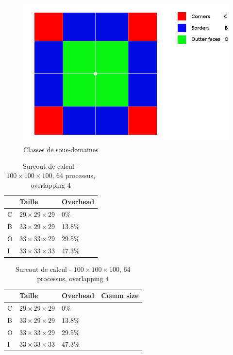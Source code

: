 \begin{figure}[h!t]
  \centering
  \includegraphics[scale=0.3]{figures/domain_dese.png}
  \caption{\label{fig:domain_desequilibre}Classes de sous-domaines}
\end{figure}

\begin{table}[h!]
  \begin{center}
    \begin{tabular}{|P{2cm}|P{3.5cm}|P{3.5cm}|}
      \hline
      & Taille & Overhead \\ \hline
      C & $29\times29\times29$ & 0\%  \\ \hline
      B & $33\times29\times29$ & 13.8\%  \\ \hline
      O & $33\times33\times29$ & 29.5\%  \\ \hline
      I & $33\times33\times33$ & 47.3\%  \\ \hline      
    \end{tabular}
    \caption{\label{arr:overlap_res}Surcout de calcul - $100\times100\times100$, 64 processus, overlapping 4}
  \end{center}
\end{table}

\begin{table}[h!]
  \begin{center}
    \begin{tabular}{|P{2cm}|P{3.5cm}|P{3.5cm}|P{3.5cm}}
      \hline
      & Taille & Overhead & Comm size\\ \hline
      C & $29\times29\times29$ & 0\%      &  \\ \hline
      B & $33\times29\times29$ & 13.8\%  &   \\ \hline
      O & $33\times33\times29$ & 29.5\%  &   \\ \hline
      I & $33\times33\times33$ & 47.3\%   &   \\ \hline      
    \end{tabular}
    \caption{\label{arr:overlap_res}Surcout de calcul - $100\times100\times100$, 64 processus, overlapping 4}
  \end{center}
\end{table}

